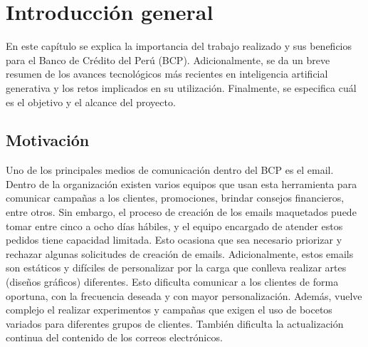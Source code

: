 
\chapter{Introducción general} %

\label{Chapter1} %
\label{IntroGeneral}


\newcommand{\keyword}[1]{\textbf{#1}}
\newcommand{\tabhead}[1]{\textbf{#1}}
\newcommand{\code}[1]{\texttt{#1}}
\newcommand{\file}[1]{\texttt{\bfseries#1}}
\newcommand{\option}[1]{\texttt{\itshape#1}}
\newcommand{\grados}{$^{\circ}$}



En este capítulo se explica la importancia del trabajo realizado y sus beneficios para el Banco de Crédito del Perú (BCP). Adicionalmente, se da un breve resumen de los avances tecnológicos más recientes en inteligencia artificial generativa y los retos implicados en su utilización. Finalmente, se especifica cuál es el objetivo y el alcance del proyecto.

\section{Motivación}

Uno de los principales medios de comunicación dentro del BCP es el email. Dentro de la organización existen varios equipos que usan esta herramienta para comunicar campañas a los clientes, promociones, brindar consejos financieros, entre otros. Sin embargo, el proceso de creación de los emails maquetados puede tomar entre cinco a ocho días hábiles, y el equipo encargado de atender estos pedidos tiene capacidad limitada. Esto ocasiona que sea necesario priorizar y rechazar algunas solicitudes de creación de emails. Adicionalmente, estos emails son estáticos y difíciles de personalizar por la carga que conlleva realizar artes (diseños gráficos) diferentes. Esto dificulta comunicar a los clientes de forma oportuna, con la frecuencia deseada y con mayor personalización. Además, vuelve complejo el realizar experimentos y campañas que exigen el uso de bocetos variados para diferentes grupos de clientes. También dificulta la actualización continua del contenido de los correos electrónicos.

